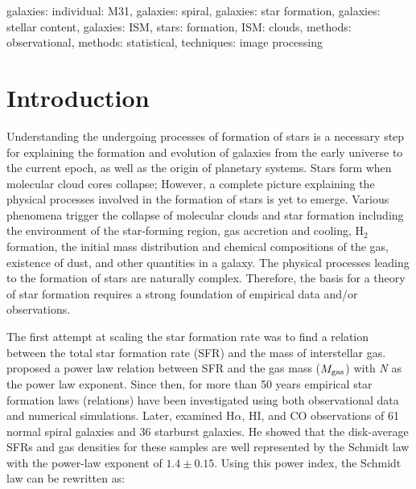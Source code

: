 \documentclass[useAMS,usenatbib]{mn2e}
\begin{document}
\begin{keywords} 
galaxies: individual: M31, galaxies: spiral, galaxies: star formation, galaxies: stellar content, galaxies: ISM, stars: formation, ISM: clouds, methods: observational, methods: statistical, techniques: image processing 
\end{keywords}


\section{Introduction}
\label{sec:intro}

Understanding the undergoing processes of formation of stars is a necessary step for explaining the formation and evolution of galaxies from the early universe to the current epoch, as well as the origin of planetary systems. Stars form when molecular cloud cores collapse; However, a complete picture explaining the physical processes involved in the formation of stars is yet to emerge. Various phenomena trigger the collapse of molecular clouds and star formation including the environment of the star-forming region, gas accretion and cooling, H$_2$ formation, the initial mass distribution and chemical compositions of the gas,  existence of dust, and other quantities in a galaxy. The physical processes leading to the formation of stars are naturally complex. Therefore, the basis for a theory of star formation requires a strong foundation of empirical data and/or observations.

The first attempt at scaling the star formation rate was to find a relation between the total star formation rate (SFR) and the mass of interstellar gas. \cite{Schmidt59} proposed a power law relation between SFR and the gas mass ($M_{\rm gas}$) with {\it N} as the power law exponent. Since then, for more than 50 years empirical star formation laws (relations) have been investigated using both observational data and numerical simulations. Later, \cite{Kennicutt98a} examined H$\alpha$, HI, and CO observations of 61 normal spiral galaxies and 36 starburst galaxies. He showed that the disk-average SFRs and gas densities for these samples are well represented by the Schmidt law with the power-law exponent of $1.4 \pm 0.15$. Using this power index, the Schmidt law can be rewritten as: %
\end{document}
